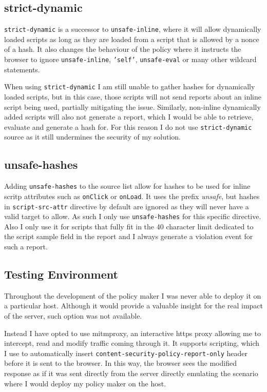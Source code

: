 \subsection{strict-dynamic}

\texttt{strict-dynamic} is a successor to \texttt{unsafe-inline}, where it will allow dynamically loaded scripts as long as they are loaded from a script that is allowed by a nonce of a hash.
It also changes the behaviour of the policy where it instructs the browser to ignore \texttt{unsafe-inline}, \texttt{'self'}, \texttt{unsafe-eval} or many other wildcard statements.

When using \texttt{strict-dynamic} I am still unable to gather hashes for dynamically loaded scripts, but in this case, those scripts will not send reports about an inline script being used, partially mitigating the issue.
Similarly, non-inline dynamically added scripts will also not generate a report, which I would be able to retrieve, evaluate and generate a hash for.
For this reason I do not use \texttt{strict-dynamic} source as it still undermines the security of my solution.

\subsection{unsafe-hashes}

Adding \texttt{unsafe-hashes} to the source list allow for hashes to be used for inline scritp attributes such as \texttt{onClick} or \texttt{onLoad}.
It uses the prefix {\it unsafe}, but hashes in \texttt{script-src-attr} directive by default are ignored as they will never have a valid target to allow.
As such I only use \texttt{unsafe-hashes} for this specific directive. 
Also I only use it for scripts that fully fit in the 40 character limit dedicated to the script sample field in the report and I always generate a violation event for such a report.

\subsection{Testing Environment}

Throughout the development of the policy maker I was never able to deploy it on a particular host.
Although it would provide a valuable insight for the real impact of the server, such option was not available.

Instead I have opted to use mitmproxy, an interactive https proxy allowing me to intercept, read and modify traffic coming through it.
It supports scripting, which I use to automatically insert \texttt{content-security-policy-report-only} header before it is sent to the browser.
In this way, the browser sees the modified response as if it was sent directly from the server directly emulating the scenario where I would deploy my policy maker on the host.

